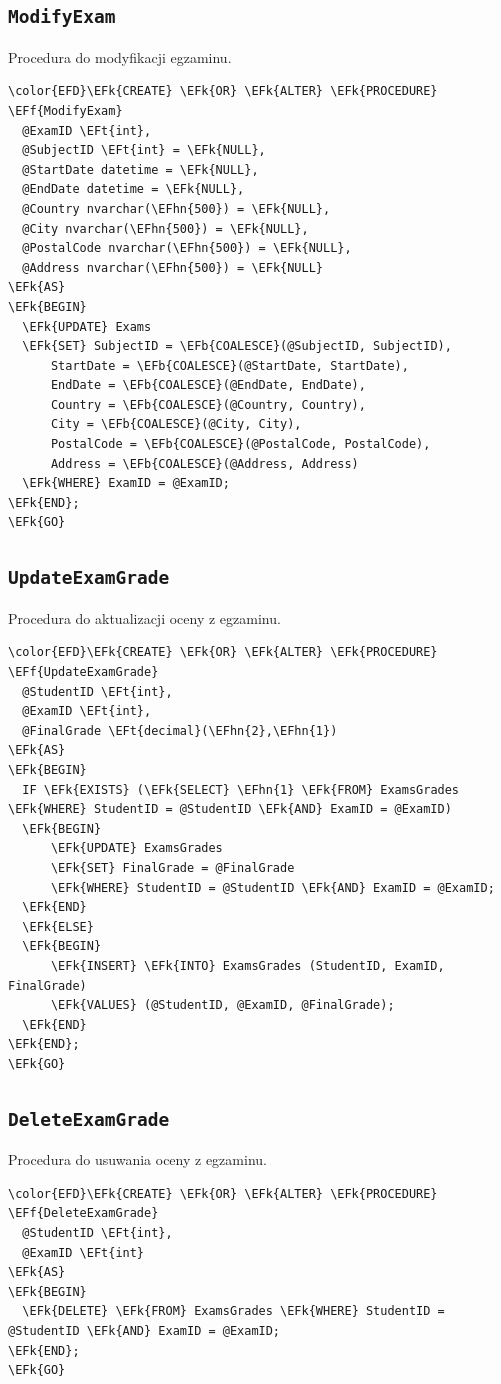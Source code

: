 \documentclass[11pt]{article}
\newcommand{\EFk}[1]{\textcolor{EFk}{\textbf{#1}}} %
\newcommand{\EFb}[1]{\textcolor{EFb}{\textbf{#1}}} %
\newcommand{\EFf}[1]{\textcolor{EFf}{#1}} %
\newcommand{\EFt}[1]{\textcolor{EFt}{\textbf{#1}}} %
\newcommand{\EFhn}[1]{\textcolor{EFhn}{#1}} %
\begin{document}
\subsection{\texttt{ModifyExam}}
\label{sec:orgfc3e956}
Procedura do modyfikacji egzaminu.
\begin{Code}
\begin{Verbatim}
\color{EFD}\EFk{CREATE} \EFk{OR} \EFk{ALTER} \EFk{PROCEDURE} \EFf{ModifyExam}
  @ExamID \EFt{int},
  @SubjectID \EFt{int} = \EFk{NULL},
  @StartDate datetime = \EFk{NULL},
  @EndDate datetime = \EFk{NULL},
  @Country nvarchar(\EFhn{500}) = \EFk{NULL},
  @City nvarchar(\EFhn{500}) = \EFk{NULL},
  @PostalCode nvarchar(\EFhn{500}) = \EFk{NULL},
  @Address nvarchar(\EFhn{500}) = \EFk{NULL}
\EFk{AS}
\EFk{BEGIN}
  \EFk{UPDATE} Exams
  \EFk{SET} SubjectID = \EFb{COALESCE}(@SubjectID, SubjectID),
      StartDate = \EFb{COALESCE}(@StartDate, StartDate),
      EndDate = \EFb{COALESCE}(@EndDate, EndDate),
      Country = \EFb{COALESCE}(@Country, Country),
      City = \EFb{COALESCE}(@City, City),
      PostalCode = \EFb{COALESCE}(@PostalCode, PostalCode),
      Address = \EFb{COALESCE}(@Address, Address)
  \EFk{WHERE} ExamID = @ExamID;
\EFk{END};
\EFk{GO}
\end{Verbatim}
\end{Code}
\subsection{\texttt{UpdateExamGrade}}
\label{sec:org0e420f4}
Procedura do aktualizacji oceny z egzaminu.
\begin{Code}
\begin{Verbatim}
\color{EFD}\EFk{CREATE} \EFk{OR} \EFk{ALTER} \EFk{PROCEDURE} \EFf{UpdateExamGrade}
  @StudentID \EFt{int},
  @ExamID \EFt{int},
  @FinalGrade \EFt{decimal}(\EFhn{2},\EFhn{1})
\EFk{AS}
\EFk{BEGIN}
  IF \EFk{EXISTS} (\EFk{SELECT} \EFhn{1} \EFk{FROM} ExamsGrades \EFk{WHERE} StudentID = @StudentID \EFk{AND} ExamID = @ExamID)
  \EFk{BEGIN}
      \EFk{UPDATE} ExamsGrades
      \EFk{SET} FinalGrade = @FinalGrade
      \EFk{WHERE} StudentID = @StudentID \EFk{AND} ExamID = @ExamID;
  \EFk{END}
  \EFk{ELSE}
  \EFk{BEGIN}
      \EFk{INSERT} \EFk{INTO} ExamsGrades (StudentID, ExamID, FinalGrade)
      \EFk{VALUES} (@StudentID, @ExamID, @FinalGrade);
  \EFk{END}
\EFk{END};
\EFk{GO}
\end{Verbatim}
\end{Code}
\subsection{\texttt{DeleteExamGrade}}
\label{sec:org3c7fadb}
Procedura do usuwania oceny z egzaminu.
\begin{Code}
\begin{Verbatim}
\color{EFD}\EFk{CREATE} \EFk{OR} \EFk{ALTER} \EFk{PROCEDURE} \EFf{DeleteExamGrade}
  @StudentID \EFt{int},
  @ExamID \EFt{int}
\EFk{AS}
\EFk{BEGIN}
  \EFk{DELETE} \EFk{FROM} ExamsGrades \EFk{WHERE} StudentID = @StudentID \EFk{AND} ExamID = @ExamID;
\EFk{END};
\EFk{GO}
\end{Verbatim}
\end{Code}
\end{document}
